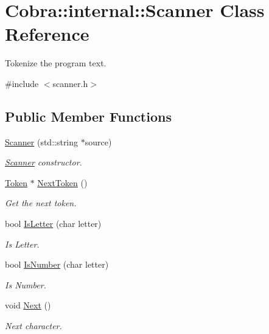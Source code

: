 \hypertarget{class_cobra_1_1internal_1_1_scanner}{\section{Cobra\+:\+:internal\+:\+:Scanner Class Reference}
\label{class_cobra_1_1internal_1_1_scanner}
}


Tokenize the program text.  




{\ttfamily \#include $<$scanner.\+h$>$}

\subsection*{Public Member Functions}
\begin{DoxyCompactItemize}
\item 
\hyperlink{class_cobra_1_1internal_1_1_scanner_a2daf5f3b5ac2add3dc79550498f07fae}{Scanner} (std\+::string $\ast$source)
\begin{DoxyCompactList}\small\item\em \hyperlink{class_cobra_1_1internal_1_1_scanner}{Scanner} constructor. \end{DoxyCompactList}\item 
\hyperlink{class_cobra_1_1internal_1_1_token}{Token} $\ast$ \hyperlink{class_cobra_1_1internal_1_1_scanner_a6955998dffd994214f647d54b8ab7520}{Next\+Token} ()
\begin{DoxyCompactList}\small\item\em Get the next token. \end{DoxyCompactList}\item 
bool \hyperlink{class_cobra_1_1internal_1_1_scanner_ad7389381cf80cf16cfa899eb850cfba6}{Is\+Letter} (char letter)
\begin{DoxyCompactList}\small\item\em Is Letter. \end{DoxyCompactList}\item 
bool \hyperlink{class_cobra_1_1internal_1_1_scanner_a82a5e48b515f8654b4da655e383f9701}{Is\+Number} (char letter)
\begin{DoxyCompactList}\small\item\em Is Number. \end{DoxyCompactList}\item 
void \hyperlink{class_cobra_1_1internal_1_1_scanner_ad825a7aec4f91d9317ed24bcd2c30bcc}{Next} ()
\begin{DoxyCompactList}\small\item\em Next character. \end{DoxyCompactList}\item 

\end{DoxyCompactItemize}
